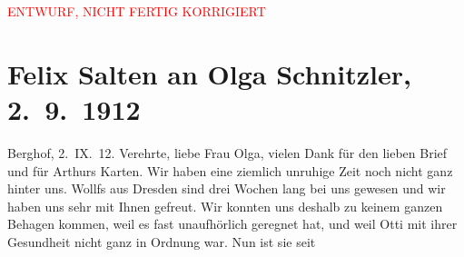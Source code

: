 
\begin{center}
            \textcolor{red}{ENTWURF, NICHT FERTIG KORRIGIERT}
                      \end{center}
            
         
         \renewcommand{\erwaehntePersonen}{Personen:  ?? [Eigentümer der Cottagegasse 37],  ?? [Haushaltshilfe der Familie Salten 1912], Samuel Fischer, Hedwig Fischer, Richard Kralik, Ottilie Salten, Olga Schnitzler, Elisabeth Steinrück, Julius Ferdinand Wollf, Johanna Sophie Wollf}
         \renewcommand{\erwaehnteInstitutionen}{Institutionen: Burgtheater}
         \renewcommand{\erwaehnteOrte}{Orte: Berghof, Dresden, München, Sanatorium Hera, Unterach am Attersee, Wien}
         \renewcommand{\erwaehnteWerke}{}
               \section[Felix Salten an Olga Schnitzler, 2. 9. 1912]{ Felix Salten an Olga Schnitzler, 2. 9. 1912}\nopagebreak{}\rehead{ }\begin{ledgroupsized}[t]{13cm}\normalsize\beginnumbering \toendnotes[C]{\smallbreak\pagebreak[2]} 
\toendnotes[C]{\smallbreak}\pstart
           \raggedleft{}{\pb}Berghof, 2. IX. 12. \pend
           \pstart{}Verehrte, liebe Frau Olga,\pend\pstart
           vielen Dank für den lieben Brief und für Arthurs Karten. Wir haben eine ziemlich unruhige Zeit noch nicht ganz hinter
               uns. Wollfs aus Dresden sind drei Wochen lang bei uns gewesen und wir haben uns
               sehr mit Ihnen gefreut. Wir konnten uns deshalb zu keinem ganzen Behagen kommen, weil
               es fast unaufhörlich geregnet hat, und weil Otti mit ihrer Gesundheit nicht ganz in Ordnung war. Nun ist sie seit

\end{ledgroupsized}
